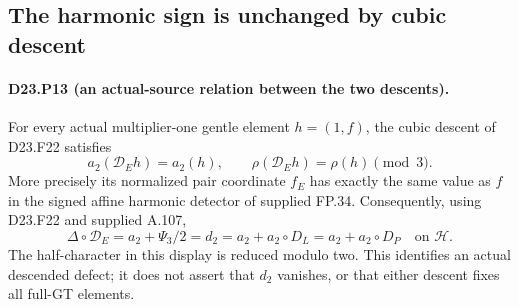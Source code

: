 \subsection{The harmonic sign is unchanged by cubic descent}

\paragraph{D23.P13 (an actual-source relation between the two descents).}
For every actual multiplier-one gentle element $h=(1,f)$,
the cubic descent of D23.F22 satisfies
\[
 \boxed{\quad a_2(\mathcal D_Eh)=a_2(h),\qquad
 \rho(\mathcal D_Eh)=\rho(h)\pmod3.\quad}
\tag{D23.P13.1}
\]
More precisely its normalized pair coordinate $f_E$ has exactly
the same value as $f$ in the signed affine harmonic detector of
supplied FP.34. Consequently, using D23.F22 and supplied A.107,
\[
 \boxed{\quad
 \Delta\circ\mathcal D_E
 =a_2+\Psi_3/2
 =d_2
 =a_2+a_2\circ D_L
 =a_2+a_2\circ D_P
 \quad\text{on }\mathcal H.\quad}
\tag{D23.P13.2}
\]
The half-character in this display is reduced modulo two.
This identifies an actual descended defect; it does not assert
that $d_2$ vanishes, or that either descent fixes all full-GT
elements.

